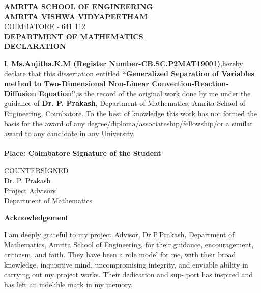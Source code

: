\documentclass[a4paper,12pt]{article}
\numberwithin{equation}{section}
\begin{document}
\begin{titlepage}
\begin{center}
{\large{\bf{{AMRITA SCHOOL OF ENGINEERING}}}}\\
\vspace{0.2cm}
{\Large{\bf{{AMRITA VISHWA VIDYAPEETHAM}}}}\\
\vspace{0.2cm}
COIMBATORE - 641 112\\
\vspace{0.5cm}
{\normalsize{\bf{{DEPARTMENT OF MATHEMATICS}}}}\\
\vspace{0.3cm}
{\large{\bf{{DECLARATION}}}}
\end{center}
I,{\bf{ Ms.Anjitha.K.M (Register Number-CB.SC.P2MAT19001)}},hereby declare that this dissertation entitled {\bf{“Generalized Separation of Variables method to Two-Dimensional Non-Linear Convection-Reaction-Diffusion Equation”}},is the record of the original work done by me under the guidance of {\bf{ Dr. P.  Prakash}}, Department of Mathematics, Amrita School of Engineering, Coimbatore.  To the best of knowledge this work has not formed the basis for the award of any degree/diploma/associateship/fellowship/or a similar award to any candidate in any University.\\
\newline \\
{{\bf{Place: Coimbatore}}\hspace{6cm} {\bf{Signature of the Student}}}
{}\\
\vspace{3cm}
\begin{center}
{\large{COUNTERSIGNED}}\\
Dr.  P. Prakash\\
Project Advisors\\
Department of Mathematics
\end{center}
\end{titlepage}

\tableofcontents
\newpage
\begin{center}
\Large\textbf{Acknowledgement}
\end{center} 
\vspace{0.5cm}
I am deeply grateful to my project Advisor, Dr.P.Prakash, Department of Mathematics, Amrita School of Engineering, for their guidance, encouragement, criticism, and faith. They have been a role model for me, with their broad knowledge, inquisitive mind, uncompromising integrity, and enviable ability in carrying out my project works. Their dedication and sup- port has inspired and has left an indelible mark in my memory.\vspace{0.5cm}
\end{document}
